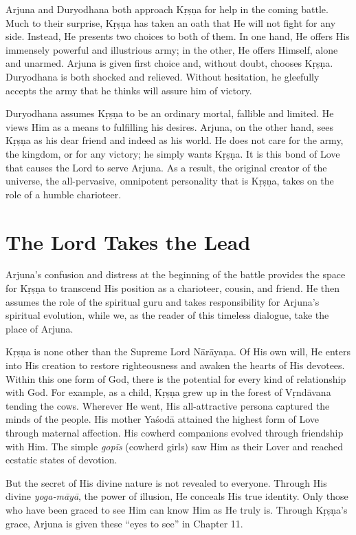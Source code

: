 \documentclass[12pt, twoside, openright]{memoir}
\begin{document}
Arjuna and Duryodhana both approach Kṛṣṇa for help in the coming battle. Much to their surprise, Kṛṣṇa has taken an oath that He will not fight for any side. Instead, He presents two choices to both of them. In one hand, He offers His immensely powerful and illustrious army; in the other, He offers Himself, alone and unarmed. Arjuna is given first choice and, without doubt, chooses Kṛṣṇa. Duryodhana is both shocked and relieved. Without hesitation, he gleefully accepts the army that he thinks will
assure him of victory.

Duryodhana assumes Kṛṣṇa to be an ordinary mortal, fallible and limited. He views Him as a means to fulfilling his desires. Arjuna, on the other hand, sees Kṛṣṇa as his dear friend and indeed as his world. He does not care for the army, the kingdom, or for any victory; he simply wants Kṛṣṇa. It is this bond of Love that causes the Lord to serve Arjuna. As a result, the original creator of the universe, the all-pervasive, omnipotent personality that is Kṛṣṇa, takes on the role of a humble charioteer.


\section{The Lord Takes the Lead}\label{sec-the-lord-takes-the-lead}

Arjuna’s confusion and distress at the beginning of the battle provides the space for Kṛṣṇa to transcend His position as a charioteer, cousin, and friend. He then assumes the role of the spiritual guru and takes responsibility for Arjuna’s spiritual evolution, while we, as the reader of this timeless dialogue, take the place of Arjuna.

Kṛṣṇa is none other than the Supreme Lord Nārāyaṇa. Of His own will, He enters into His creation to restore righteousness and awaken the hearts of His devotees. Within this one form of God, there is the potential for every kind of relationship with God. For example, as a child, Kṛṣṇa grew up in the forest of Vṛndāvana tending the cows. Wherever He went, His all-attractive persona captured the minds of the people. His mother Yaśodā attained the highest form of Love through maternal affection. His cowherd companions evolved through friendship with Him. The simple \textit{gopīs} (cowherd girls) saw Him as their Lover and reached ecstatic states of devotion.

But the secret of His divine nature is not revealed to everyone. Through His divine \textit{yoga-māyā}, the power of illusion, He conceals His true identity. Only those who have been graced to see Him can know Him as He truly is. Through Kṛṣṇa’s grace, Arjuna is given these \enquote{eyes to see} in Chapter 11. 
\end{document}
